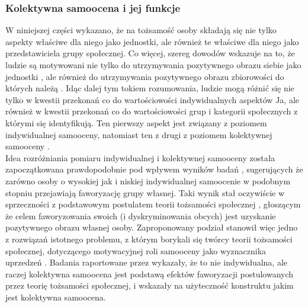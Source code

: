 \documentclass[man]{apa6}
\begin{document}
\subsubsection{Kolektywna samoocena i jej funkcje}

W niniejszej części wykazano, że na tożsamość osoby składają się nie tylko aspekty właściwe dla niego jako jednostki, ale również te właściwe dla niego jako przedstawiciela grupy społecznej. Co więcej, szereg dowodów wskazuje na to, że ludzie są motywowani nie tylko do utrzymywania pozytywnego obrazu siebie jako jednostki \parencite[patrz,][]{greenwald1980totalitarian}, ale również do utrzymywania pozytywnego obrazu zbiorowości do których należą \parencite{tajfel1986social}. Idąc dalej tym tokiem rozumowania, ludzie mogą różnić się nie tylko w kwestii przekonań co do wartościowości indywidualnych aspektów Ja, ale również w kwestii przekonań co do wartościowości grup i kategorii społecznych z którymi się identyfikują. Ten pierwszy aspekt jest związany z poziomem indywidualnej samooceny, natomiast ten z drugi z poziomem kolektywnej samooceny \parencite{crocker1990collective}.\\

Idea rozróżniania pomiaru indywidualnej i kolektywnej samooceny została zapoczątkowana prawdopodobnie pod wpływem wyników badań \textcite{crocker1985prejudice}, sugerujących że zarówno osoby o wysokiej jak i niskiej indywidualnej samoocenie w podobnym stopniu przejawiają faworyzację grupy własnej. Taki wynik stał oczywiście w sprzeczności z podstawowym postulatem teorii tożsamości społecznej \parencite{tajfel1986social}, głoszącym że celem faworyzowania swoich (i dyskryminowania obcych) jest uzyskanie pozytywnego obrazu własnej osoby. Zaproponowany podział stanowił więc jedno z rozwiązań istotnego problemu, z którym borykali się twórcy teorii tożsamości społecznej, dotyczącego motywacyjnej roli samooceny jako wyznacznika uprzedzeń \parencite[zob. np.,][]{abrams1988comments}. Badania raportowane przez \textcite{crocker1990collective} wykazały, że to nie indywidualna, ale raczej kolektywna samoocena jest podstawą efektów faworyzacji postulowanych przez teorię tożsamości społecznej, i wskazały na użyteczność konstruktu jakim jest kolektywna samoocena.\\
\end{document}
